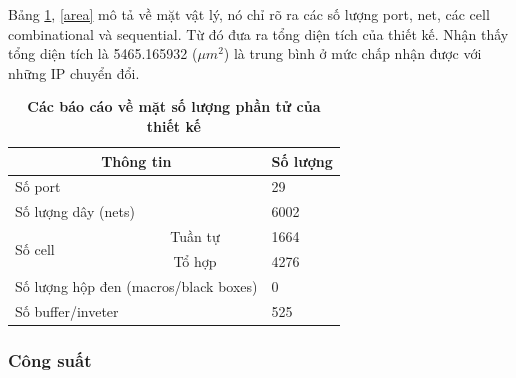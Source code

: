 Bảng \ref{cell}, \ref{area} mô tả về mặt vật lý, nó chỉ rõ ra các số lượng port, net, các cell combinational và sequential. Từ đó đưa ra tổng diện tích của thiết kế.
Nhận thấy tổng diện tích là 5465.165932 ($\mu m^2$) là trung bình ở mức chấp nhận được với những IP chuyển đổi.
\begin{table}[H]
\centering
    \caption[Các báo cáo về mặt số lượng phần tử của thiết kế]{\bfseries \fontsize{12pt}{0pt}\selectfont Các báo cáo về mặt số lượng phần tử của thiết kế}
    \begin{tabular}{|lc|l|}
\hline
\multicolumn{2}{|c|}{\textbf{Thông tin}}                    & \multicolumn{1}{c|}{\textbf{Số lượng}} \\ \hline
\multicolumn{2}{|l|}{Số port}                               & 29                                     \\ \hline
\multicolumn{2}{|l|}{Số lượng dây (nets)}                   & 6002                                   \\ \hline
\multicolumn{1}{|l|}{\multirow{2}{*}{Số cell}}   & Tuần tự  & 1664                                   \\ \cline{2-3} 
\multicolumn{1}{|l|}{}                           & Tổ hợp   & 4276                                   \\ \hline
\multicolumn{2}{|l|}{Số lượng hộp đen (macros/black boxes)} & 0                                      \\ \hline
\multicolumn{2}{|l|}{Số buffer/inveter}                     & 525                                    \\ \hline
\end{tabular}
    \label{cell}
    \end{table}

\subsubsection{Công suất}




